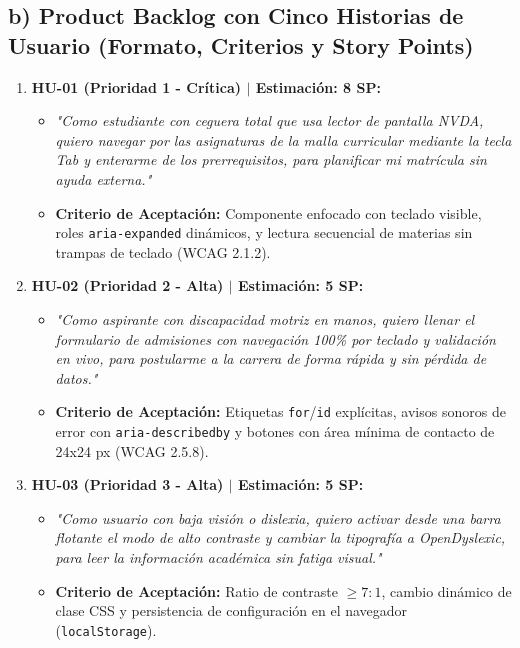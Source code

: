 \documentclass[10pt,a4paper]{article}
\begin{document}
\subsection*{\normalsize\color{utiNavy}b) Product Backlog con Cinco Historias de Usuario (Formato, Criterios y Story Points)}

\begin{enumerate}\setlength\itemsep{3pt}\small
    \item \textbf{HU-01 (Prioridad 1 - Crítica) $\vert$ Estimación: 8 SP:}
    \begin{itemize}\footnotesize
        \item \textit{"Como estudiante con ceguera total que usa lector de pantalla NVDA, quiero navegar por las asignaturas de la malla curricular mediante la tecla Tab y enterarme de los prerrequisitos, para planificar mi matrícula sin ayuda externa."}
        \item \textbf{Criterio de Aceptación:} Componente enfocado con teclado visible, roles \texttt{aria-expanded} dinámicos, y lectura secuencial de materias sin trampas de teclado (WCAG 2.1.2).
    \end{itemize}
    \item \textbf{HU-02 (Prioridad 2 - Alta) $\vert$ Estimación: 5 SP:}
    \begin{itemize}\footnotesize
        \item \textit{"Como aspirante con discapacidad motriz en manos, quiero llenar el formulario de admisiones con navegación 100\% por teclado y validación en vivo, para postularme a la carrera de forma rápida y sin pérdida de datos."}
        \item \textbf{Criterio de Aceptación:} Etiquetas \texttt{for}/\texttt{id} explícitas, avisos sonoros de error con \texttt{aria-describedby} y botones con área mínima de contacto de 24x24 px (WCAG 2.5.8).
    \end{itemize}
    \item \textbf{HU-03 (Prioridad 3 - Alta) $\vert$ Estimación: 5 SP:}
    \begin{itemize}\footnotesize
        \item \textit{"Como usuario con baja visión o dislexia, quiero activar desde una barra flotante el modo de alto contraste y cambiar la tipografía a OpenDyslexic, para leer la información académica sin fatiga visual."}
        \item \textbf{Criterio de Aceptación:} Ratio de contraste $\ge 7:1$, cambio dinámico de clase CSS y persistencia de configuración en el navegador (\texttt{localStorage}).

\end{itemize}
\end{enumerate}
\end{document}
